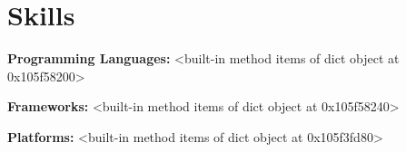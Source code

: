 \section{Skills}

    \begin{onecolentry}
        \textbf{Programming Languages:} <built-in method items of dict object at 0x105f58200>
    \end{onecolentry}

    \vspace{0.05 cm}

    \begin{onecolentry}
        \textbf{Frameworks:} <built-in method items of dict object at 0x105f58240>
    \end{onecolentry}

    \vspace{0.05 cm}

    \begin{onecolentry}
        \textbf{Platforms:} <built-in method items of dict object at 0x105f3fd80>
    \end{onecolentry}

    \vspace{0.05 cm}


